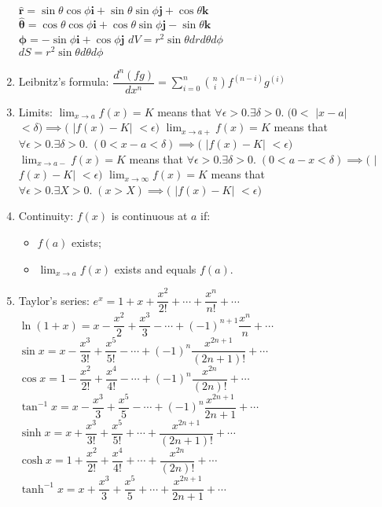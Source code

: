 \documentclass[fleqn]{article}
\begin{document}
\begin{enumerate}
        $\hat{\mathbf{r}}=\sin\theta\cos\phi\mathbf{i}+\sin\theta\sin\phi\mathbf{j}+\cos\theta\mathbf{k}$\\
        $\hat{\bm{\theta}}=\cos\theta\cos\phi\mathbf{i}+\cos\theta\sin\phi\mathbf{j}-\sin\theta\mathbf{k}$\\
        $\hat{\bm{\phi}}=-\sin\phi\mathbf{i}+\cos\phi\mathbf{j}$\smallbreak
        $dV=r^2\sin\theta dr d\theta d\phi$\\
        $dS=r^2\sin\theta d\theta d\phi$
    \item Leibnitz's formula:\smallbreak
        $\dfrac{d^n(fg)}{dx^n}=\displaystyle\sum_{i=0}^{n}\binom{n}{i}f^{(n-i)}g^{(i)}$
    \item Limits: \smallbreak
        $\displaystyle\lim_{x\to a}f(x)=K$ means that
        $\forall\epsilon>0.\exists\delta>0.\;(0<$ $|$$x-a$$|$ $<\delta)\implies($ $|$$f(x)-K$$|$ $<\epsilon)$\smallbreak
        $\displaystyle\lim_{x\to a+}f(x)=K$ means that
        $\forall\epsilon>0.\exists\delta>0.\;(0<x-a<\delta)\implies($ $|$$f(x)-K$$|$ $<\epsilon)$\smallbreak
        $\displaystyle\lim_{x\to a-}f(x)=K$ means that
        $\forall\epsilon>0.\exists\delta>0.\;(0<a-x<\delta)\implies($ $|$$f(x)-K$$|$ $<\epsilon)$\smallbreak
        $\displaystyle\lim_{x\to\infty}f(x)=K$ means that
        $\forall\epsilon>0.\exists X>0.\;(x>X)\implies($ $|$$f(x)-K$$|$ $<\epsilon)$
    \item Continuity: $f(x)$ is continuous at $a$ if:
        \begin{itemize}
            \item $f(a)$ exists;
            \item $\displaystyle\lim_{x\to a}f(x)$ exists and equals $f(a)$.
        \end{itemize}
    \newpage
    \item Taylor's series:\smallbreak
        $e^x=1+x+\dfrac{x^2}{2!}+\cdots+\dfrac{x^n}{n!}+\cdots$\smallbreak
        $\ln(1+x)=x-\dfrac{x^2}{2}+\dfrac{x^3}{3}-\cdots+(-1)^{n+1}\dfrac{x^n}{n}+\cdots$\smallbreak
        $\sin x=x-\dfrac{x^3}{3!}+\dfrac{x^5}{5!}-\cdots+(-1)^n\dfrac{x^{2n+1}}{(2n+1)!}+\cdots$\smallbreak
        $\cos x=1-\dfrac{x^2}{2!}+\dfrac{x^4}{4!}-\cdots+(-1)^n\dfrac{x^{2n}}{(2n)!}+\cdots$\smallbreak
        $\tan^{-1}x=x-\dfrac{x^3}{3}+\dfrac{x^5}{5}-\cdots+(-1)^n\dfrac{x^{2n+1}}{2n+1}+\cdots$\smallbreak
        $\sinh x=x+\dfrac{x^3}{3!}+\dfrac{x^5}{5!}+\cdots+\dfrac{x^{2n+1}}{(2n+1)!}+\cdots$\smallbreak
        $\cosh x=1+\dfrac{x^2}{2!}+\dfrac{x^4}{4!}+\cdots+\dfrac{x^{2n}}{(2n)!}+\cdots$\smallbreak
        $\tanh^{-1}x=x+\dfrac{x^3}{3}+\dfrac{x^5}{5}+\cdots+\dfrac{x^{2n+1}}{2n+1}+\cdots$

\end{enumerate}
\end{document}
